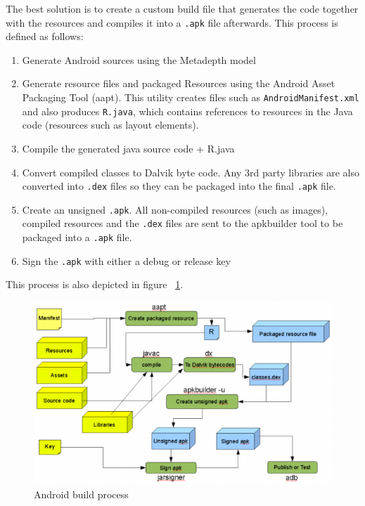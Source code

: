The best solution is to create a custom build file that generates the code together with the resources and compiles it into a \texttt{.apk} file afterwards. This process is defined as follows:
\begin{enumerate}
\item{Generate Android sources using the Metadepth model}
\item{Generate resource files and packaged Resources using the Android Asset Packaging Tool (aapt). This utility creates files such as \texttt{AndroidManifest.xml} and also produces \texttt{R.java}, which contains references to resources in the Java code (resources such as layout elements).}
\item{Compile the generated java source code + R.java}
\item{Convert compiled classes to Dalvik byte code. Any 3rd party libraries are also converted into \texttt{.dex} files so they can be packaged into the final \texttt{.apk} file.}
\item{Create an unsigned \texttt{.apk}. All non-compiled resources (such as images), compiled resources and the \texttt{.dex} files are sent to the apkbuilder tool to be packaged into a \texttt{.apk} file.}
\item{Sign the \texttt{.apk} with either a debug or release key}
\end{enumerate}
This process is also depicted in figure ~\ref{fig:android_process}.
\begin{figure}[h!]
\centering
\includegraphics[width=1.0\textwidth]{images/chap6_android_build_process.png}
\caption{Android build process}
\label{fig:android_process}
\end{figure}
